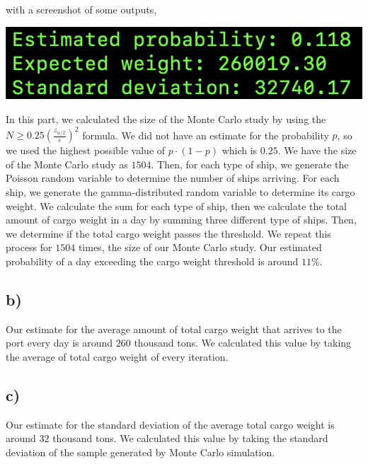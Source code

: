 \documentclass[12pt]{article}
\begin{document}
\noindent
with a screenshot of some outputs,

\begin{center}
  \includegraphics[scale = 1]{the4_output.png}
\end{center}

In this part, we calculated the size of the Monte Carlo study by using the $N
\geq 0.25(\frac{z_{\alpha/2}}{\varepsilon})^2$ formula. We did not have an
estimate for the probability $p$, so we used the highest possible value of
$p\cdot(1-p)$ which is $0.25$. We have the size of the Monte Carlo study as
$1504$. Then, for each type of ship, we generate the Poisson random variable to
determine the number of ships arriving. For each ship, we generate the
gamma-distributed random variable to determine its cargo weight. We calculate
the sum for each type of ship, then we calculate the total amount of cargo
weight in a day by summing three different type of ships. Then, we determine if
the total cargo weight passes the threshold. We repeat this process for $1504$
times, the size of our Monte Carlo study. Our estimated probability of a day
exceeding the cargo weight threshold is around $11\%$.

\subsection*{b)}

Our estimate for the average amount of total cargo weight that arrives to the
port every day is around $260$ thousand tons. We calculated this value by taking
the average of total cargo weight of every iteration.

\subsection*{c)}

Our estimate for the standard deviation of the average total cargo weight is
around $32$ thousand tons. We calculated this value by taking the standard
deviation of the sample generated by Monte Carlo simulation.
\end{document}
